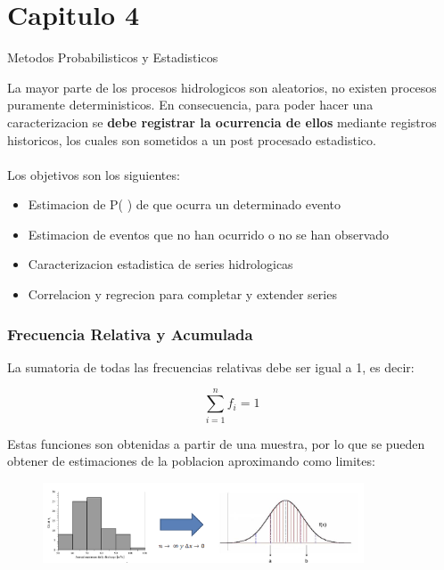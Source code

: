 \part{Capitulo 4}
\vspace{-0.3cm}
\begin{center}
    \begin{large}
        Metodos Probabilisticos y Estadisticos
    \end{large}
\end{center}

La mayor parte de los procesos hidrologicos son aleatorios, no existen procesos puramente deterministicos. En consecuencia, para poder hacer una caracterizacion se \textbf{debe registrar la ocurrencia de ellos} mediante registros historicos, los cuales son sometidos a un post procesado estadistico.
\\ \\
Los objetivos son los siguientes:

\begin{itemize}
    \item Estimacion de P( ) de que ocurra un determinado evento
    \item Estimacion de eventos que no han ocurrido o no se han observado
    \item Caracterizacion estadistica de series hidrologicas
    \item Correlacion y regrecion para completar y extender series
\end{itemize}

\section{Frecuencia Relativa y Acumulada}

La sumatoria de todas las frecuencias relativas debe ser igual a 1, es decir:

\begin{equation}
    \sum_{i=1}^{n} f_i = 1
\end{equation}

Estas funciones son obtenidas a partir de una muestra, por lo que se pueden obtener de estimaciones de la poblacion aproximando como limites:

\begin{figure}[H]
    \centering
    \includegraphics[width=0.85\textwidth]{imagenes/frecuencia.png}
    \label{fig:frecuencia_acumulada}
\end{figure}

